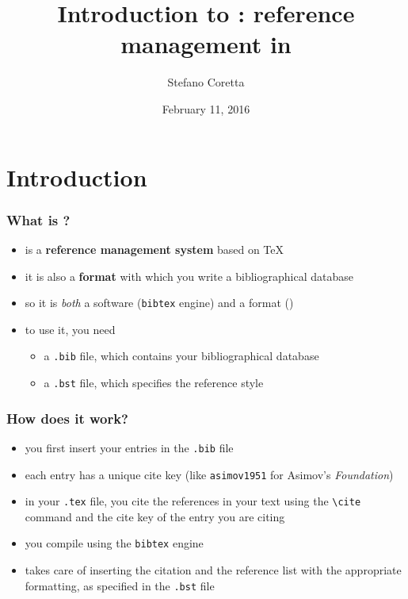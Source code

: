 \documentclass{beamer}
\title[Introduction to \hologo{BibTeX}]{Introduction to \hologo{BibTeX}: reference management in \XeLaTeX}
\author{Stefano Coretta}
\date{February 11, 2016}
\begin{document}

\begin{frame}
	\maketitle
\end{frame}


\section{Introduction}

\begin{frame}
    \frametitle{What is ?}

\begin{itemize}
    \item {} is a \textbf{reference management system} based on \TeX{}
    \item it is also a \textbf{format} with which you write a bibliographical database
    \item so it is \textit{both} a software (\texttt{bibtex} engine) and a format ()
    \item to use it, you need
    \begin{itemize}
    \item a \texttt{.bib} file, which contains your bibliographical database
    \item a \texttt{.bst} file, which specifies the reference style
    \end{itemize}
\end{itemize}

\end{frame}


\begin{frame}[fragile]
    \frametitle{How does it work?}

\begin{itemize}
    \item you first insert your entries in the \texttt{.bib} file
    \item each entry has a unique cite key (like \texttt{asimov1951} for Asimov's \textit{Foundation})
    \item in your \texttt{.tex} file, you cite the references in your text using the \verb+\cite+ command and the cite key of the entry you are citing
    \item you compile using the \texttt{bibtex} engine
    \item {} takes care of inserting the citation and the reference list with the appropriate formatting, as specified in the \texttt{.bst} file
\end{itemize}

\end{frame}
\end{document}
